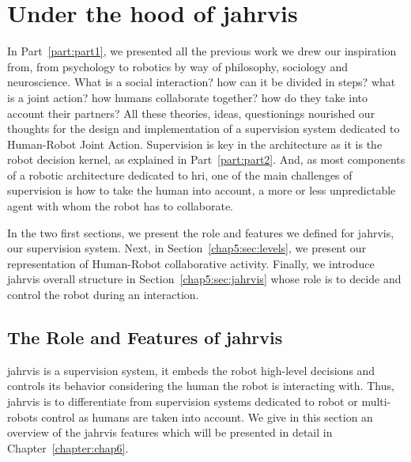 \documentclass[a4paper,11pt,twoside]{StyleThese}
\begin{document}
	\setcounter{chapter}{4} %
	\dominitoc
	\faketableofcontents
	\fi

\chapter{Under the hood of \acrshort{jahrvis}}
\label{chapter:chap5}
\minitoc

In Part~\ref{part:part1}, we presented all the previous work we drew our inspiration from, from psychology to robotics by way of philosophy, sociology and neuroscience. What is a social interaction? how can it be divided in steps? what is a joint action? how humans collaborate together? how do they take into account their partners?   All these theories, ideas, questionings nourished our thoughts for the design and implementation of a supervision system dedicated to Human-Robot Joint Action. Supervision is key in the architecture as it is the robot decision kernel, as explained in Part~\ref{part:part2}. And, as most components of a robotic architecture dedicated to \acrshort{hri}, one of the main challenges of supervision is how to take the human into account, a more or less unpredictable agent with whom the robot has to collaborate. 

In the two first sections, we present the role and features we defined for \acrfull{jahrvis}, our supervision system. Next, in Section~\ref{chap5:sec:levels}, we present our representation of Human-Robot collaborative activity. Finally, we introduce \acrshort{jahrvis} overall structure in Section~\ref{chap5:sec:jahrvis} whose role is to decide and control the robot during an interaction.

\section{The Role and Features of \acrshort{jahrvis}}\label{chap5:sec:sup_features}

\acrshort{jahrvis} is a supervision system, \ie it embeds the robot high-level decisions and controls its behavior considering the human the robot is interacting with. Thus, \acrshort{jahrvis} is to differentiate from supervision systems dedicated to robot or multi-robots control as humans are taken into account. We give in this section an overview of the \acrshort{jahrvis} features which will be presented in detail in Chapter~\ref{chapter:chap6}.
\end{document}
